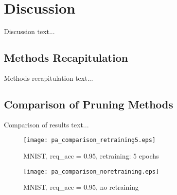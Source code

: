 \chapter{Discussion} \label{chap:discussion}
Discussion text...

\section{Methods Recapitulation} \label{sec:methods_recapitulation}
Methods recapitulation text...

\section{Comparison of Pruning Methods} \label{sec:comparison_of_pruning_methods}
Comparison of results text...

\begin{figure}[H]
\centering
\texttt{[image: pa\_comparison\_retraining5.eps]}
\caption{MNIST, req\_acc = 0.95, retraining: 5 epochs}
\label{fig:discussion:pa_comparison_retraining5}
\end{figure}

\begin{figure}[H]
\centering
\texttt{[image: pa\_comparison\_noretraining.eps]}
\caption{MNIST, req\_acc = 0.95, no retraining}
\label{fig:discussion:pa_comparison_noretraining}
\end{figure}